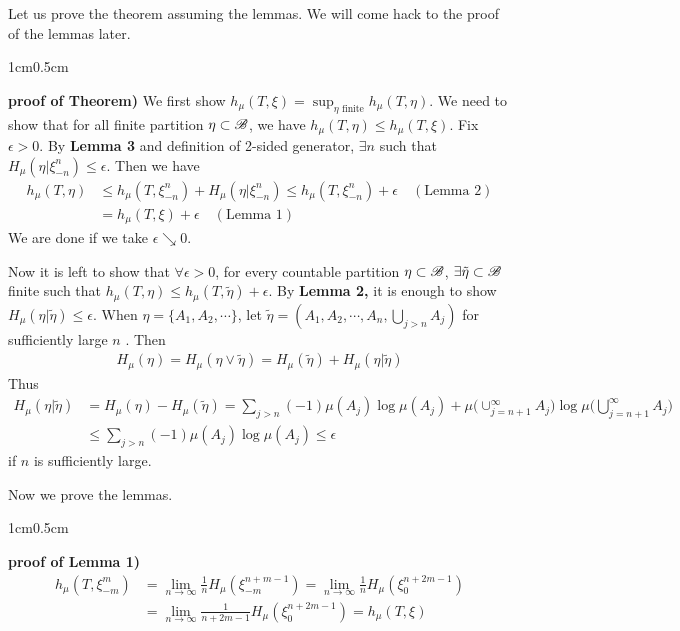 \documentclass[12pt,a4paper]{report}
\newenvironment{proof}
{\begin{changemargin}{1cm}{0.5cm} 
	}%
	{\end{changemargin}
}
\begin{document}
Let us prove the theorem assuming the lemmas. We will come hack to the proof of the lemmas later.
\s

\begin{proof}
\textbf{proof of Theorem)} We first show $h_{\mu} (T,\xi) = \sup_{\eta \text{ finite}} h_{\mu} (T,\eta)$. We need to show that for all finite partition $\eta \subset \mathscr{B}$, we have $h_{\mu}(T,\eta) \leq h_{\mu}(T,\xi)$. Fix $\epsilon>0$. By \textbf{Lemma 3} and definition of 2-sided generator, $\exists n$ such that $H_{\mu}(\eta | \xi^n_{-n}) \leq \epsilon$. Then we have
\begin{align*}
h_{\mu}(T,\eta) & \leq h_{\mu}(T,\xi_{-n}^n) + H_{\mu}(\eta | \xi^n_{-n}) \leq h_{\mu}(T,\xi_{-n}^n) + \epsilon \quad (\text{Lemma 2}) \\
& = h_{\mu} (T,\xi) + \epsilon \quad (\text{Lemma 1})
\end{align*}
We are done if we take $\epsilon \searrow 0$.
\s

Now it is left to show that $\forall \epsilon >0$, for every countable partition $\eta \subset \mathscr{B}$, $\exists \tilde{\eta} \subset \mathscr{B}$ finite such that $h_{\mu}(T,\eta) \leq h_{\mu}(T, \tilde{\eta}) + \epsilon$. By \textbf{Lemma 2,} it is enough to show $H_{\mu}(\eta |\tilde{\eta}) \leq \epsilon$. When $\eta = \{A_1, A_2, \cdots \}$, let $\tilde{\eta} = (A_1, A_2, \cdots, A_n, \bigcup_{j>n} A_j)$ for sufficiently large $n$ . Then
\begin{align*}
H_{\mu}(\eta) = H_{\mu} (\eta \vee \tilde{\eta}) = H_{\mu}(\tilde{\eta}) + H_{\mu}(\eta |\tilde{\eta})
\end{align*}
Thus
\begin{align*}
H_{\mu}(\eta | \tilde{\eta}) &= H_{\mu}(\eta) - H_{\mu}(\tilde{\eta}) = \sum_{j>n} (-1) \mu(A_j) \log \mu(A_j) + \mu \Big( \cup_{j=n+1}^{\infty} A_j \Big) \log \mu \Big( \bigcup_{j=n+1}^{\infty} A_j \Big) \\
& \leq \sum_{j>n} (-1) \mu(A_j) \log \mu(A_j) \leq \epsilon
\end{align*}
if $n$ is sufficiently large.

\eop
\end{proof}
\s

Now we prove the lemmas.
\s

\begin{proof}
\textbf{proof of Lemma 1)} \begin{align*}
h_{\mu}(T, \xi_{-m}^m) &= \lim_{n\rightarrow \infty} \frac{1}{n} H_{\mu}(\xi^{n+m-1}_{-m}) = \lim_{n\rightarrow \infty} \frac{1}{n} H_{\mu} (\xi_0^{n+2m -1}) \\
&= \lim_{n\rightarrow \infty} \frac{1}{n+2m-1} H_{\mu}(\xi_0^{n+2m-1}) = h_{\mu}(T,\xi)
\end{align*}

\eop
\end{proof}
\s
\end{document}

